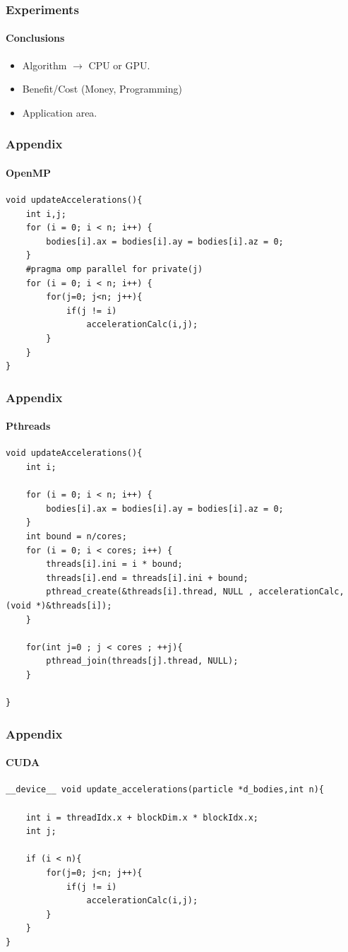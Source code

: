 \frame
{
\frametitle{Experiments}
\framesubtitle{Conclusions}

\begin{itemize}
    \item<1-> Algorithm  $\rightarrow$ CPU or GPU.
    \item<2-> Benefit/Cost (Money, Programming)
    \item<3-> Application area.
\end{itemize}

}


\begin{frame}[fragile]
\frametitle{Appendix}
\framesubtitle{OpenMP}
\begin{lstlisting}[style=C]
void updateAccelerations(){
    int i,j;
    for (i = 0; i < n; i++) {
        bodies[i].ax = bodies[i].ay = bodies[i].az = 0;
    }
    #pragma omp parallel for private(j)
    for (i = 0; i < n; i++) {
        for(j=0; j<n; j++){
            if(j != i)
                accelerationCalc(i,j);
        }
    }
}
\end{lstlisting}
\end{frame}

\begin{frame}[fragile]
\frametitle{Appendix}
\framesubtitle{Pthreads}
\begin{lstlisting}[style=C]
void updateAccelerations(){
    int i;

    for (i = 0; i < n; i++) {
        bodies[i].ax = bodies[i].ay = bodies[i].az = 0;
    }
    int bound = n/cores;
    for (i = 0; i < cores; i++) {
        threads[i].ini = i * bound;
        threads[i].end = threads[i].ini + bound;
        pthread_create(&threads[i].thread, NULL , accelerationCalc, (void *)&threads[i]);
    }

    for(int j=0 ; j < cores ; ++j){
        pthread_join(threads[j].thread, NULL);
    }

}
\end{lstlisting}
\end{frame}

\begin{frame}[fragile]
\frametitle{Appendix}
\framesubtitle{CUDA}
\begin{lstlisting}[style=C]
__device__ void update_accelerations(particle *d_bodies,int n){

    int i = threadIdx.x + blockDim.x * blockIdx.x;
    int j;

    if (i < n){
        for(j=0; j<n; j++){
            if(j != i)
                accelerationCalc(i,j);
        }
    }
}
\end{lstlisting}
\end{frame}



